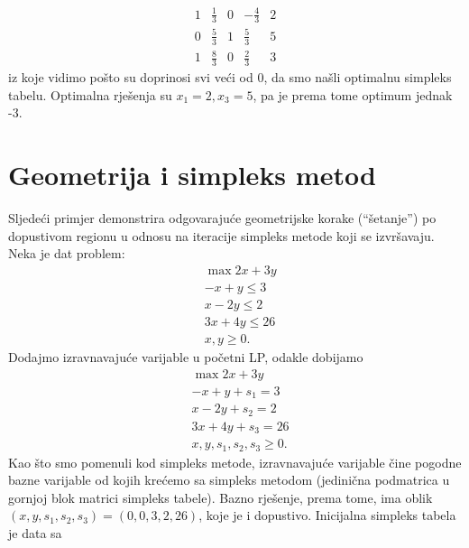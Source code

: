 \documentclass[a4paper, utf8, 11pt, colorlinks]{book}
\begin{document}
$$ \begin{array}{cccc|c}
       1   & \frac{1}{3}       & 0             &   -\frac{4}{3}             &   2  \\
       0   & \frac{5}{3}       & 1	           & \frac{5}{3}                 &   5 \\ \hline
       1   & \frac{8}{3}       & 0             &  \frac{2}{3}               &   3  
   \end{array}
 $$
 iz koje vidimo pošto su doprinosi svi veći od 0, da smo našli optimalnu simpleks tabelu.  Optimalna rješenja su 
 $x_1=2, x_3=5$, pa je prema tome optimum jednak -3.
 
 \section{Geometrija i simpleks metod}
 
Sljedeći primjer demonstrira odgovarajuće geometrijske korake (``šetanje'') po dopustivom regionu u odnosu na iteracije simpleks metode koji se izvršavaju.   %
 Neka je dat problem:
 \begin{align*}
 	&\max 2x + 3y \\
 	& -x + y \leq 3 \\
 	& x - 2y \leq 2 \\
 	& 3x + 4y \leq 26 \\
 	& x, y \geq 0.
 \end{align*}
 Dodajmo izravnavajuće varijable u početni LP, odakle dobijamo 
  \begin{align*}
 	&\max 2x + 3y \\
 	& -x + y + s_1 = 3 \\
 	& x - 2y + s_2 = 2 \\
 	& 3x + 4y + s_3 =  26 \\
 	& x, y, s_1, s_2, s_3 \geq 0.
 \end{align*}
Kao što smo pomenuli kod simpleks metode, 
izravnavajuće varijable čine pogodne bazne varijable od kojih krećemo 
sa simpleks metodom (jedinična podmatrica u gornjoj blok matrici 
simpleks tabele). Bazno rješenje, prema tome, ima oblik 
$(x, y, s_1, s_2, s_3) = (0, 0, 3, 2, 26)$, koje je i dopustivo. Inicijalna simpleks 
tabela je data sa
\end{document}
